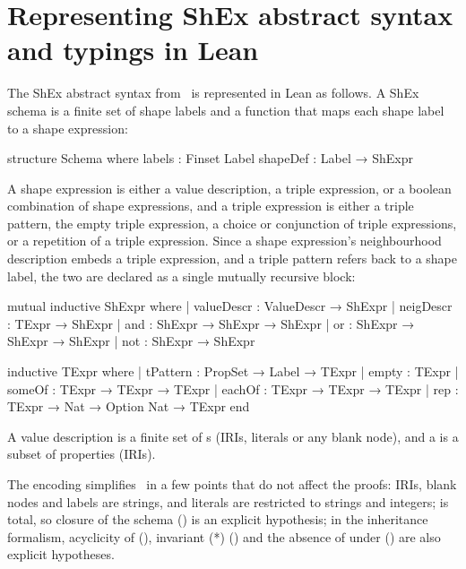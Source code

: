 \section{Representing ShEx abstract syntax and typings in Lean} \label{sec:shex_lean}

The ShEx abstract syntax from~\cite{BGP17} is represented in Lean as follows.
A ShEx schema is a finite set of shape labels and a function that maps each
shape label to a shape expression:

\begin{leanlisting}
structure Schema where
  labels   : Finset Label
  shapeDef : Label → ShExpr
\end{leanlisting}

A shape expression  is either a value description,
 a triple expression, or a boolean combination of shape expressions,
 and a triple expression  is either a triple pattern,
 the empty triple expression,
 a choice or conjunction of triple expressions,
 or a repetition of a triple expression.
 Since a shape expression's neighbourhood description embeds a triple
 expression, and a triple pattern refers back to a shape label,
 the two are declared as a single mutually recursive block:

 \begin{leanlisting}
mutual
inductive ShExpr where
  | valueDescr : ValueDescr → ShExpr
  | neigDescr  : TExpr → ShExpr
  | and        : ShExpr → ShExpr → ShExpr
  | or         : ShExpr → ShExpr → ShExpr
  | not        : ShExpr → ShExpr

inductive TExpr where
  | tPattern : PropSet → Label → TExpr
  | empty    : TExpr
  | someOf   : TExpr → TExpr → TExpr
  | eachOf   : TExpr → TExpr → TExpr
  | rep      : TExpr → Nat → Option Nat → TExpr
end
\end{leanlisting}

A value description  is a finite set of s (IRIs, literals or any blank
node), and a  is a subset of properties (IRIs).

The encoding simplifies~\cite{BGP17,ShExInheritance} in a few points that
do not affect the proofs: IRIs, blank nodes and labels are strings, and
literals are restricted to strings and integers; 
 is total, so closure of the schema () is an explicit hypothesis; 
 in the inheritance formalism, acyclicity of  (),
invariant (*) () and the absence of 
under  () are also explicit hypotheses.